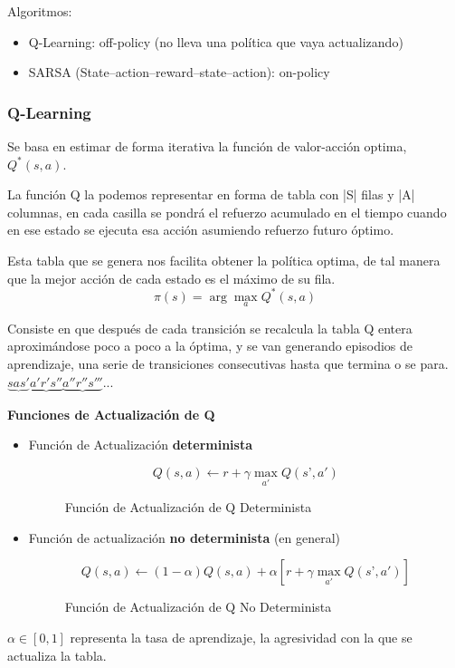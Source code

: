 \documentclass[12pt]{report} %
\begin{document}
Algoritmos:
\begin{itemize}
  \item Q-Learning: off-policy (no lleva una política que vaya actualizando)
  \item SARSA (State–action–reward–state–action): on-policy
\end{itemize}

\subsubsection{Q-Learning}
Se basa en estimar de forma iterativa la función de valor-acción optima, $Q^*(s, a)$. 

La función Q la podemos representar en forma de tabla con |S| filas y |A| columnas, en cada casilla se pondrá el refuerzo acumulado en el tiempo cuando en ese estado se ejecuta esa acción asumiendo refuerzo futuro óptimo.

Esta tabla que se genera nos facilita obtener la política optima, de tal manera que la mejor acción de cada estado es el máximo de su fila.
$$\pi(s) = \arg \max _a Q^* (s, a)$$

Consiste en que después de cada transición se recalcula la tabla Q entera aproximándose poco a poco a la óptima, y se van generando episodios de aprendizaje, una serie de transiciones consecutivas hasta que termina o se para. $\underbrace{sas'} \underbrace{a'r's''} \underbrace{a''r''s'''}...$

\textbf{Funciones de Actualización de Q}
\begin{itemize}
  \item Función de Actualización \textbf{determinista}
  \begin{figure}[H]
    $$Q(s, a) \leftarrow r + \gamma \max_{a'} Q(s’, a')$$

    \captionsetup{justification=centering}
    \caption{Función de Actualización de Q Determinista}
  \end{figure}
  \item Función de actualización \textbf{no determinista} (en general)
  \begin{figure}[H]
    $$Q(s, a) \leftarrow (1-\alpha) Q(s, a) + \alpha[r + \gamma \max_{a'} Q(s’, a')]$$

    \captionsetup{justification=centering}
    \caption{Función de Actualización de Q No Determinista}
  \end{figure}
\end{itemize}

$\alpha \in [0,1]$ representa la tasa de aprendizaje, la agresividad con la que se actualiza la tabla.
\end{document}
